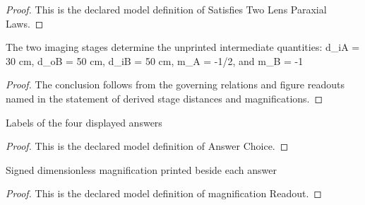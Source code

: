 \begin{proof}
  This is the declared model definition of Satisfies Two Lens Paraxial Laws.
\end{proof}
\begin{lemma}
  \label{lem:physics:phyx-mini-0134:phyxminiproblems-problemphyxmini0134-derived-stage-distances-and-magnifications}
  The two imaging stages determine the unprinted intermediate quantities: d\_iA = 30 cm, d\_oB = 50 cm, d\_iB = 50 cm, m\_A = -1/2, and m\_B = -1
\end{lemma}
\begin{proof}
  The conclusion follows from the governing relations and figure readouts named in the statement of derived stage distances and magnifications.
\end{proof}
\begin{definition}
  \label{def:physics:phyx-mini-0134:phyxminiproblems-problemphyxmini0134-answerchoice}
  Labels of the four displayed answers
\end{definition}
\begin{proof}
  This is the declared model definition of Answer Choice.
\end{proof}
\begin{definition}
  \label{def:physics:phyx-mini-0134:phyxminiproblems-problemphyxmini0134-answerchoice-magnificationreadout}
  Signed dimensionless magnification printed beside each answer
\end{definition}
\begin{proof}
  This is the declared model definition of magnification Readout.
\end{proof}
